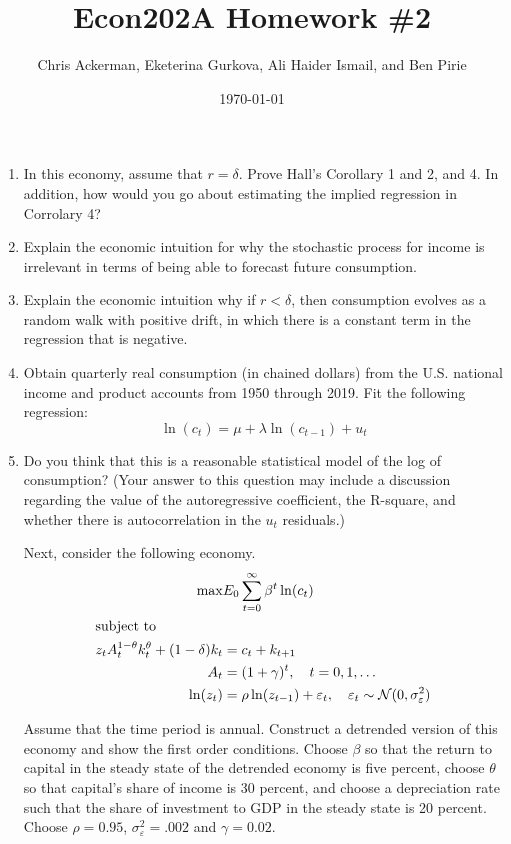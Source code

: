 \documentclass[11pt]{article}
\author{Chris Ackerman, Eketerina Gurkova, Ali Haider Ismail, and Ben Pirie}
\date{\today}
\title{Econ202A Homework \#2}
\begin{document}
\maketitle
\newpage

\begin{enumerate}
\item In this economy, assume that $r = \delta$. Prove Hall’s Corollary 1 and 2, and 4. In addition, how would you go about estimating the implied regression in Corrolary 4?

\newpage
\item Explain the economic intuition for why the stochastic process for income is irrelevant in terms of being able to forecast future consumption. 

\newpage
\item Explain the economic intuition why if $r < \delta$, then consumption evolves as a random walk with positive drift, in which there is a constant term in the regression that is negative. 

\newpage
\item  Obtain quarterly real consumption (in chained dollars) from the U.S.
national income and product accounts from 1950 through 2019. Fit the following
regression:
\[
\ln(c_t) = \mu + \lambda \ln(c_{t-1}) + u_t
\]

\newpage
\item  Do you think that this is a reasonable statistical model of the log of
consumption? (Your answer to this question may include a discussion regarding
the value of the autoregressive coefficient, the R-square, and whether there is
autocorrelation in the $u_t$ residuals.)

\newpage
Next, consider the following economy.
\begin{align*}
\max & E_0 \sum^\infty_{t = 0}\beta^t \ln (c_t)\\
\intertext{subject to}
z_t A_t^{1 - \theta} k_t^\theta + (1 - \delta)k_t &= c_t + k_{t + 1}\\
A_t &= (1 + \gamma)^t, \quad t = 0, 1, \ldots \\
\ln(z_t) &= \rho \ln (z_{t - 1}) + \varepsilon_t,\quad \varepsilon_t \sim \mathcal{N}(0, \sigma^2_\varepsilon)
\end{align*}

Assume that the time period is annual. Construct a detrended version of
this economy and show the first order conditions. Choose $\beta$ so that the return
to capital in the steady state of the detrended economy is five percent, choose
$\theta$ so that capital’s share of income is 30 percent, and choose a depreciation rate
such that the share of investment to GDP in the steady state is 20 percent.
Choose $\rho = 0.95$, $\sigma^2_\varepsilon
 = .002$ and $\gamma = 0.02$.


\end{enumerate}
\end{document}
